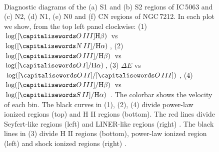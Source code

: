 \documentclass[../thesis.tex]{subfiles}
\begin{document}
\begin{figure}
\\
\caption[]{Diagnostic diagrams of the (a) S1 and (b) S2 regions of IC\,5063 and (c) N2, (d) N1, (e) N0 and (f) CN  regions of NGC\,7212.  In each plot we show, from the top left panel clockwise: (1) $\log([\ion{O}{III}] \Hb)$ vs $\log([\ion{N}{II}]/ \Ha)$, (2) $\log([\ion{O}{III}]/ \Hb)$ vs $\log([\ion{O}{I}]/ \Ha)$, (3) $\Delta E$ vs $\log([\ion{O}{II}]/[\ion{O}{III}])$, (4) $\log([\ion{O}{III}]/ \Hb)$ vs $\log([\ion{S}{II}]/ \Ha)$ \citep{Baldwin81, Veilleux87}. The colorbar shows the velocity of each bin. The black curves in (1), (2), (4) divide power-law ionized regions (top) and H II regions (bottom). The red lines divide Seyfert-like regions (left) and LINER-like regions (right) \citep{Kewley06}. The black lines in (3) divide H II regions (bottom), power-law ionized region (left) and shock ionized regions (right) \citep{Baldwin81}.   }
\label{fig:diag_n0cnN}
\end{figure}
\end{document}
